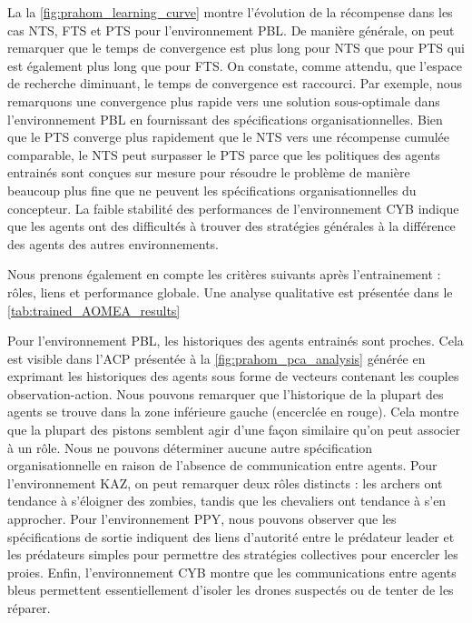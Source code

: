 La la \autoref{fig:prahom_learning_curve} montre l'évolution de la récompense dans les cas NTS, FTS et PTS pour l'environnement PBL. De manière générale, on peut remarquer que le temps de convergence est plus long pour NTS que pour PTS qui est également plus long que pour FTS. On constate, comme attendu, que l'espace de recherche diminuant, le temps de convergence est raccourci. Par exemple, nous remarquons une convergence plus rapide vers une solution sous-optimale dans l'environnement PBL en fournissant des spécifications organisationnelles. Bien que le PTS converge plus rapidement que le NTS vers une récompense cumulée comparable, le NTS peut surpasser le PTS parce que les politiques des agents entrainés sont conçues sur mesure pour résoudre le problème de manière beaucoup plus fine que ne peuvent les spécifications organisationnelles du concepteur. La faible stabilité des performances de l'environnement CYB indique que les agents ont des difficultés à trouver des stratégies générales à la différence des agents des autres environnements.

Nous prenons également en compte les critères suivants après l'entrainement : rôles, liens et performance globale. Une analyse qualitative est présentée dans le \autoref{tab:trained_AOMEA_results}
%

%
%
Pour l'environnement PBL, les historiques des agents entrainés sont proches. Cela est visible dans l'ACP présentée à la \autoref{fig:prahom_pca_analysis} générée en exprimant les historiques des agents sous forme de vecteurs contenant les couples observation-action. Nous pouvons remarquer que l'historique de la plupart des agents se trouve dans la zone inférieure gauche (encerclée en rouge). Cela montre que la plupart des pistons semblent agir d'une façon similaire qu'on peut associer à un rôle. Nous ne pouvons déterminer aucune autre spécification organisationnelle en raison de l'absence de communication entre agents. Pour l'environnement KAZ, on peut remarquer deux rôles distincts : les archers ont tendance à s'éloigner des zombies, tandis que les chevaliers ont tendance à s'en approcher. Pour l'environnement PPY, nous pouvons observer que les spécifications de sortie indiquent des liens d'autorité entre le prédateur leader et les prédateurs simples pour permettre des stratégies collectives pour encercler les proies. Enfin, l'environnement CYB montre que les communications entre agents bleus permettent essentiellement d'isoler les drones suspectés ou de tenter de les réparer.

